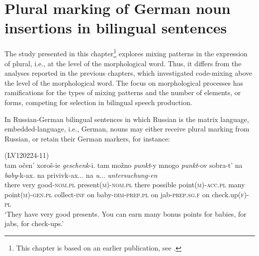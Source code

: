 \chapter{Plural marking of German noun insertions in bilingual sentences}\label{PL}

The study presented in this chapter\footnote{This chapter is based on an earlier publication, see \citet{hakimov}.} explores mixing patterns in the expression of plural, i.e., at the level of the morphological word. Thus, it differs from the analyses reported in the previous chapters, which investigated code-mixing above the level of the morphological word. The focus on morphological processes has ramifications for the types of mixing patterns and the number of elements, or forms, competing for selection in bilingual speech production.

In Russian-German bilingual sentences in which Russian is the matrix language, embedded-language, i.e., German, nouns may either receive plural marking from Russian, or retain their German markers, for instance:

\ea (LV120224-11)\label{ex:6:1}\\
    \gll tam očen' xoroš-ie \textit{geschenk}-i. tam možno \textit{punkt}-y mnogo \textit{punkt}-ov sobra-t' na \textit{baby}-k-ax. na privivk-ax... na \textit{u}... \textit{untersuchung-en}\\
        there very good-\textsc{nom.pl} present\textsc{(m)}-\textsc{nom.pl} 
        there possible point\textsc{(m)}-\textsc{acc.pl} many point\textsc{(m)}-\textsc{gen.pl} collect-\textsc{inf} on baby-\textsc{dim}-\textsc{prep.pl} 
        on jab-\textsc{prep.sg.f} on {} check.up\textsc{(f)-pl}\\
    \glt ‘They have very good presents. You can earn many bonus points for babies, for jabs, for check-ups.’
\z

